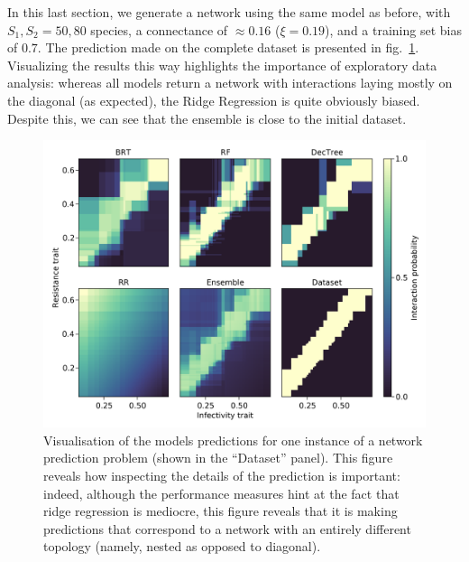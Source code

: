 \documentclass[10pt,oneside]{article}
\makeatletter
\def\maxwidth{\ifdim\Gin@nat@width>\linewidth\linewidth
\else\Gin@nat@width\fi}
\let\Oldincludegraphics\includegraphics
\renewcommand{\includegraphics}[1]{\Oldincludegraphics[width=\maxwidth]{#1}}
\makeatother
\begin{document}
In this last section, we generate a network using the same model as
before, with \(S_1, S_2 = 50, 80\) species, a connectance of
\(\approx 0.16\) (\(\xi = 0.19\)), and a training set bias of \(0.7\).
The prediction made on the complete dataset is presented in
fig.~\ref{fig:ecovalid}. Visualizing the results this way highlights the
importance of exploratory data analysis: whereas all models return a
network with interactions laying mostly on the diagonal (as expected),
the Ridge Regression is quite obviously biased. Despite this, we can see
that the ensemble is close to the initial dataset.

\begin{figure}
\hypertarget{fig:ecovalid}{%
\centering
\includegraphics{figures/valid_ensemble.png}
\caption{Visualisation of the models predictions for one instance of a
network prediction problem (shown in the ``Dataset'' panel). This figure
reveals how inspecting the details of the prediction is important:
indeed, although the performance measures hint at the fact that ridge
regression is mediocre, this figure reveals that it is making
predictions that correspond to a network with an entirely different
topology (namely, nested as opposed to diagonal).}\label{fig:ecovalid}
}
\end{figure}
\end{document}
